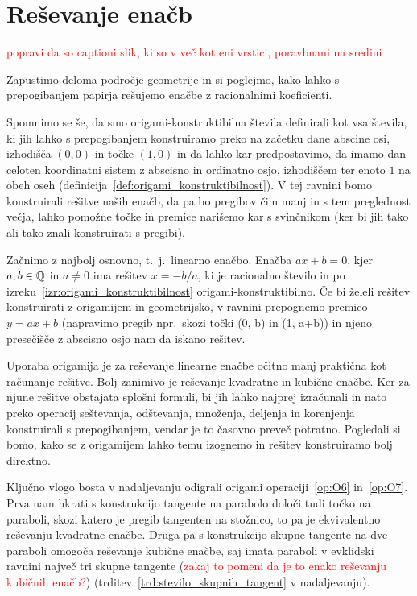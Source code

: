 \section{Reševanje enačb}
\label{pogl:enacbe}


\textcolor{red}{popravi da so captioni slik, ki so v več kot eni vrstici, poravbnani na sredini}

Zapustimo deloma področje geometrije in si poglejmo, kako lahko s prepogibanjem papirja rešujemo enačbe z racionalnimi koeficienti.

Spomnimo se še, da smo origami-konstruktibilna števila definirali kot vsa števila, ki jih lahko s prepogibanjem konstruiramo preko na začetku dane abscine osi, izhodišča $(0,0)$ in točke $(1,0)$ in da lahko kar predpostavimo, da imamo dan celoten koordinatni sistem z abscisno in ordinatno osjo, izhodiščem ter enoto $1$ na obeh oseh (definicija~\ref{def:origami_konstruktibilnost}). V tej ravnini bomo konstruirali rešitve naših enačb, da pa bo pregibov čim manj in s tem preglednost večja, lahko pomožne točke in premice narišemo kar s svinčnikom (ker bi jih tako ali tako znali konstruirati s pregibi).

Začnimo z najbolj osnovno, t.\ j.\ linearno enačbo. Enačba $ax + b = 0$, kjer $a, b \in \mathbb Q$ in $a \neq 0$ ima rešitev $x = -b/a$, ki je racionalno število in po izreku~\ref{izr:origami_konstruktibilnost} origami-konstruktibilno. Če bi želeli rešitev konstruirati z origamijem in geometrijsko, v ravnini prepognemo premico $y = ax + b$ (napravimo pregib npr.\ skozi točki (0, b) in (1, a+b)) in njeno presečišče z abscisno osjo nam da iskano rešitev.

Uporaba origamija je za reševanje linearne enačbe očitno manj praktična kot računanje rešitve. Bolj zanimivo je reševanje kvadratne in kubične enačbe. Ker za njune rešitve obstajata splošni formuli, bi jih lahko najprej izračunali in nato preko operacij seštevanja, odštevanja, množenja, deljenja in korenjenja konstruirali s prepogibanjem, vendar je to časovno preveč potratno. Pogledali si bomo, kako se z origamijem lahko temu izognemo in rešitev konstruiramo bolj direktno.

Ključno vlogo bosta v nadaljevanju odigrali origami operaciji~\ref{op:O6} in~\ref{op:O7}. Prva nam hkrati s konstrukcijo tangente na parabolo določi tudi točko na paraboli, skozi katero je pregib tangenten na stožnico, to pa je ekvivalentno reševanju kvadratne enačbe. Druga pa s konstrukcijo skupne tangente na dve paraboli omogoča reševanje kubične enačbe, saj imata paraboli v evklidski ravnini največ tri skupne tangente (\textcolor{red}{zakaj to pomeni da je to enako reševanju kubičnih enačb?}) (trditev~\ref{trd:stevilo_skupnih_tangent} v nadaljevanju).

